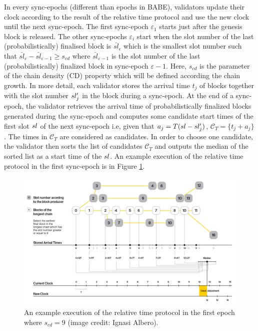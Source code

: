 In every sync-epochs (different than epochs in BABE), validators update their clock according to the result of the relative time protocol and use the new clock until the next sync-epoch. The first sync-epoch $\varepsilon_1$ starts just after the genesis block is released. The other sync-epochs  $\varepsilon_i$ start when the slot number of the last (probabilistically) finalised block is $\bar{sl}_{\epsilon}$ which is the smallest slot number such that  $\bar{sl}_{\varepsilon} - \bar{sl}_{\varepsilon-1} \geq s_{cd}$ where $\bar{sl}_{\varepsilon-1}$ is the slot number of the last (probabilistically) finalized block in sync-epoch $\varepsilon-1$. Here, $s_{cd}$ is the parameter of the chain density (CD) property which will be defined according the chain growth.
In more detail, each validator  stores  the arrival time $ t_j $ of  blocks together with the slot number $sl'_j$ in the block during a sync-epoch. At the end of a sync-epoch, the validator retrieves the arrival time of probabilistically finalized blocks generated during the sync-epoch and computes some candidate start times of the first slot $ sl $ of the next sync-epoch i.e,  given that $ a_j = T(sl - sl'_j)  $,  $\mathcal{C}_T = \{t_j+a_j \}$. The times in $ \mathcal{C}_T $ are considered as candidates. In order to  choose one candidate,  the validator then sorts the list of candidates $ \mathcal{C}_T $ and outputs the median of the sorted list as a start time of the $ sl $. An example execution of the relative time protocol in the first sync-epoch is in Figure \ref{fig:relativetime}.

\begin{figure}[h]
	\centering
	\includegraphics[width=1.\textwidth]{images/BABE3.png}
	\caption{An example execution of the relative time protocol in the first epoch where $s_{cd} = 9$ (image credit: Ignasi Albero).}
	\label{fig:relativetime}
\end{figure}
